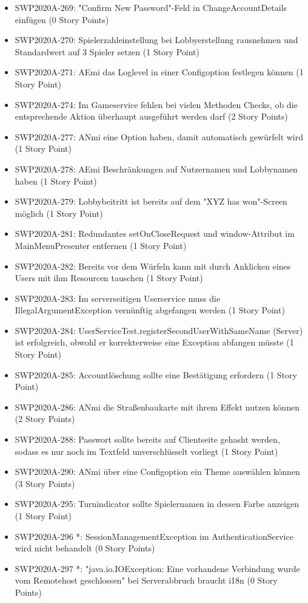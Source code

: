 \documentclass[12pt,a4paper, oneside]{article}
\begin{document}
\begin{itemize}
\item SWP2020A-269:	"Confirm New Password"-Feld in ChangeAccountDetails einfügen (0 Story Points)
\item SWP2020A-270:	Spielerzahleinstellung bei Lobbyerstellung rausnehmen und Standardwert auf 3 Spieler setzen (1 Story Point)
\item SWP2020A-271:	AEmi das Loglevel in einer Configoption festlegen können (1 Story Point)
\item SWP2020A-274:	Im Gameservice fehlen bei vielen Methoden Checks, ob die entsprechende Aktion überhaupt ausgeführt werden darf (2 Story Points)
\item SWP2020A-277:	ANmi eine Option haben, damit automatisch gewürfelt wird (1 Story Point)
\item SWP2020A-278:	AEmi Beschränkungen auf Nutzernamen und Lobbynamen haben (1 Story Point)
\item SWP2020A-279:	Lobbybeitritt ist bereits auf dem "XYZ has won"-Screen möglich (1 Story Point)
\item SWP2020A-281:	Redundantes setOnCloseRequest und window-Attribut im MainMenuPresenter entfernen (1 Story Point)
\item SWP2020A-282:	Bereits vor dem Würfeln kann mit durch Anklicken eines Users mit ihm Resourcen tauschen (1 Story Point)
\item SWP2020A-283:	Im serverseitigen Userservice muss die IllegalArgumentException vernünftig abgefangen werden (1 Story Point)
\item SWP2020A-284:	UserServiceTest.registerSecondUserWithSameName (Server) ist erfolgreich, obwohl er korrekterweise eine Exception abfangen müsste (1 Story Point)
\item SWP2020A-285:	Accountlöschung sollte eine Bestätigung erfordern (1 Story Point)
\item SWP2020A-286:	ANmi die Straßenbaukarte mit ihrem Effekt nutzen können (2 Story Points)
\item SWP2020A-288:	Passwort sollte bereits auf Clientseite gehasht werden, sodass es nur noch im Textfeld unverschlüsselt vorliegt (1 Story Point)
\item SWP2020A-290:	ANmi über eine Configoption ein Theme auswählen können (3 Story Points)
\item SWP2020A-295:	Turnindicator sollte Spielernamen in dessen Farbe anzeigen (1 Story Point)
\item SWP2020A-296 *:	SessionManagementException im AuthenticationService wird nicht behandelt (0 Story Points)
\item SWP2020A-297 *:	"java.io.IOException: Eine vorhandene Verbindung wurde vom Remotehost geschlossen" bei Serverabbruch braucht i18n (0 Story Points)

\end{itemize}
\end{document}
